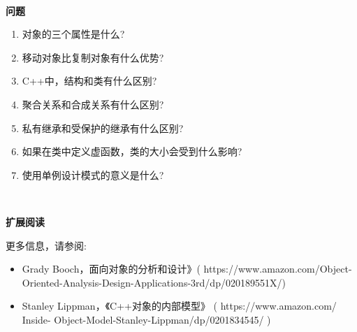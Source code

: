 \noindent\textbf{}\ \par
\textbf{问题} \ \par
\begin{enumerate}
	\item 对象的三个属性是什么?
	\item 移动对象比复制对象有什么优势?
	\item C++中，结构和类有什么区别?
	\item 聚合关系和合成关系有什么区别?
	\item 私有继承和受保护的继承有什么区别?
	\item 如果在类中定义虚函数，类的大小会受到什么影响?
	\item 使用单例设计模式的意义是什么?
\end{enumerate}

\noindent\textbf{}\ \par
\textbf{扩展阅读} \ \par
更多信息，请参阅: \par

\begin{itemize}
	\item Grady Booch，面向对象的分析和设计》( https:/​/www.​amazon.​com/Object-​Oriented-​Analysis-​Design-​Applications-​3rd/​dp/​020189551X/​ )
	\item Stanley Lippman，《C++对象的内部模型》 ( https:/​/​www.​amazon.​com/​Inside-	Object-​Model-​Stanley-​Lippman/​dp/​0201834545/​ )
\end{itemize}

\newpage



















